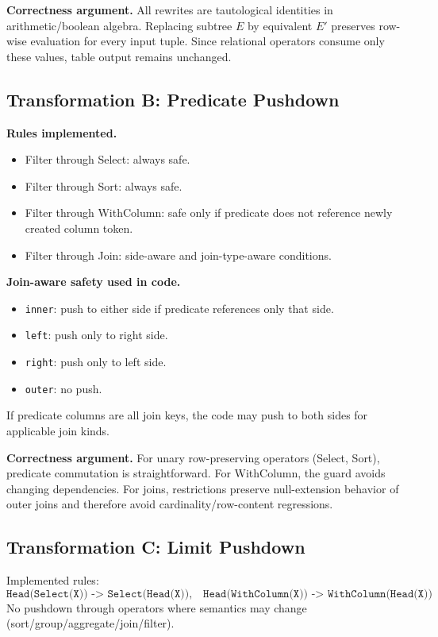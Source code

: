 \documentclass[11pt,a4paper]{article}
\begin{document}
\textbf{Correctness argument.}
All rewrites are tautological identities in arithmetic/boolean algebra. Replacing subtree \(E\) by equivalent \(E'\) preserves row-wise evaluation for every input tuple. Since relational operators consume only these values, table output remains unchanged.

\subsection{Transformation B: Predicate Pushdown}

\textbf{Rules implemented.}
\begin{itemize}[leftmargin=*]
	\item Filter through Select: always safe.
	\item Filter through Sort: always safe.
	\item Filter through WithColumn: safe only if predicate does not reference newly created column token.
	\item Filter through Join: side-aware and join-type-aware conditions.
\end{itemize}

\textbf{Join-aware safety used in code.}
\begin{itemize}[leftmargin=*]
	\item \texttt{inner}: push to either side if predicate references only that side.
	\item \texttt{left}: push only to right side.
	\item \texttt{right}: push only to left side.
	\item \texttt{outer}: no push.
\end{itemize}

If predicate columns are all join keys, the code may push to both sides for applicable join kinds.

\textbf{Correctness argument.}
For unary row-preserving operators (Select, Sort), predicate commutation is straightforward. For WithColumn, the guard avoids changing dependencies. For joins, restrictions preserve null-extension behavior of outer joins and therefore avoid cardinality/row-content regressions.

\subsection{Transformation C: Limit Pushdown}
Implemented rules:
\[
\texttt{Head(Select(X)) -> Select(Head(X))},\quad
\texttt{Head(WithColumn(X)) -> WithColumn(Head(X))}
\]
No pushdown through operators where semantics may change (sort/group/aggregate/join/filter).
\end{document}

